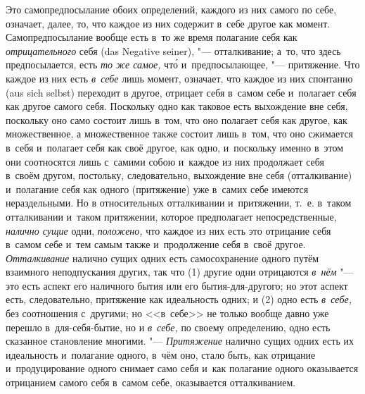 Это самопредпосылание обоих определений, каждого из них самого по себе,
означает, далее, то, что каждое из них содержит в~себе другое как момент.
Самопредпосылание вообще есть в~то же время полагание себя как
{\em отрицательного} себя (das Negative seiner), "---
отталкивание; а~то, что здесь предпосылается, есть
{\em то же самое,} чт\'{о} и~предпосылающее, "--- притяжение.
Что каждое из них есть {\em в~себе} лишь момент,
означает, что каждое из них спонтанно (aus sich selbst) переходит в
другое, отрицает себя в~самом себе и~полагает себя как другое самого себя.
Поскольку одно как таковое есть выхождение вне себя, поскольку оно само
состоит лишь в~том, что оно полагает себя как другое, как множественное, а
множественное также состоит лишь в~том, что оно сжимается в~себя и~полагает
себя как своё другое, как одно, и~поскольку именно в~этом они соотносятся
лишь с~самими собою и~каждое из них продолжает себя в~своём другом,
постольку, следовательно, выхождение вне себя (отталкивание) и~полагание
себя как одного (притяжение) уже в~самих себе имеются нераздельными. Но в
относительных отталкивании и~притяжении, т.~е. в~таком отталкивании и~таком
притяжении, которое предполагает непосредственные, {\em налично сущие} одни,
{\em положено,} что каждое из них есть это отрицание
себя в~самом себе и~тем самым также и~продолжение себя в~своё другое.
{\em Отталкивание} налично сущих одних есть
самосохранение одного путём взаимного неподпускания других, так что (1)
другие одни отрицаются {\em в~нём} "--- это есть аспект
его наличного бытия или его бытия-для-другого; но этот аспект есть,
следовательно, притяжение как идеальность одних; и (2) одно есть
{\em в~себе,} без соотношения с~другими; но <<в~себе>> не
только вообще давно уже перешло в~для-себя-бытие, но и
{\em в~себе,} по своему определению, одно есть
сказанное становление многими. "--- {\em Притяжение}
налично сущих одних есть их идеальность и~полагание одного, в~чём оно,
стало быть, как отрицание и~продуцирование одного снимает само себя и~как
полагание одного оказывается отрицанием самого себя в~самом себе,
оказывается отталкиванием.


